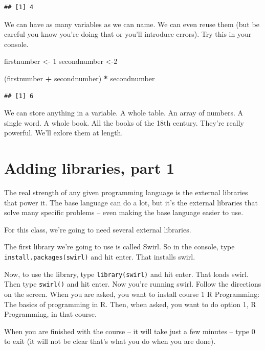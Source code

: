 \documentclass[]{book}
\newenvironment{Shaded}{\begin{snugshade}}{\end{snugshade}}
\newcommand{\DecValTok}[1]{\textcolor[rgb]{0.00,0.00,0.81}{#1}}
\newcommand{\StringTok}[1]{\textcolor[rgb]{0.31,0.60,0.02}{#1}}
\newcommand{\OperatorTok}[1]{\textcolor[rgb]{0.81,0.36,0.00}{\textbf{#1}}}
\newcommand{\NormalTok}[1]{#1}
\begin{document}
\begin{verbatim}
## [1] 4
\end{verbatim}

We can have as many variables as we can name. We can even reuse them
(but be careful you know you're doing that or you'll introduce errors).
Try this in your console.

\begin{Shaded}
\begin{Highlighting}[]
\NormalTok{firstnumber <-}\StringTok{ }\DecValTok{1}
\NormalTok{secondnumber <-}\DecValTok{2} 

\NormalTok{(firstnumber }\OperatorTok{+}\StringTok{ }\NormalTok{secondnumber) }\OperatorTok{*}\StringTok{ }\NormalTok{secondnumber}
\end{Highlighting}
\end{Shaded}

\begin{verbatim}
## [1] 6
\end{verbatim}

We can store anything in a variable. A whole table. An array of numbers.
A single word. A whole book. All the books of the 18th century. They're
really powerful. We'll exlore them at length.

\section{Adding libraries, part 1}\label{adding-libraries-part-1}

The real strength of any given programming language is the external
libraries that power it. The base language can do a lot, but it's the
external libraries that solve many specific problems -- even making the
base language easier to use.

For this class, we're going to need several external libraries.

The first library we're going to use is called Swirl. So in the console,
type
\texttt{install.packages(\textquotesingle{}swirl\textquotesingle{})} and
hit enter. That installs swirl.

Now, to use the library, type \texttt{library(swirl)} and hit enter.
That loads swirl. Then type \texttt{swirl()} and hit enter. Now you're
running swirl. Follow the directions on the screen. When you are asked,
you want to install course 1 R Programming: The basics of programming in
R. Then, when asked, you want to do option 1, R Programming, in that
course.

When you are finished with the course -- it will take just a few minutes
-- type 0 to exit (it will not be clear that's what you do when you are
done).
\end{document}

